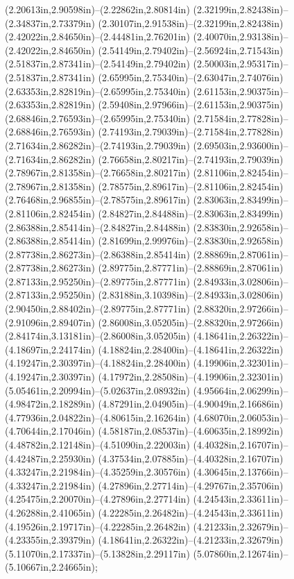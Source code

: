 (2.20613in,2.90598in)--(2.22862in,2.80814in) (2.32199in,2.82438in)--(2.34837in,2.73379in) (2.30107in,2.91538in)--(2.32199in,2.82438in) (2.42022in,2.84650in)--(2.44481in,2.76201in) (2.40070in,2.93138in)--(2.42022in,2.84650in) (2.54149in,2.79402in)--(2.56924in,2.71543in) (2.51837in,2.87341in)--(2.54149in,2.79402in) (2.50003in,2.95317in)--(2.51837in,2.87341in) (2.65995in,2.75340in)--(2.63047in,2.74076in) (2.63353in,2.82819in)--(2.65995in,2.75340in) (2.61153in,2.90375in)--(2.63353in,2.82819in) (2.59408in,2.97966in)--(2.61153in,2.90375in) (2.68846in,2.76593in)--(2.65995in,2.75340in) (2.71584in,2.77828in)--(2.68846in,2.76593in) (2.74193in,2.79039in)--(2.71584in,2.77828in) (2.71634in,2.86282in)--(2.74193in,2.79039in) (2.69503in,2.93600in)--(2.71634in,2.86282in) (2.76658in,2.80217in)--(2.74193in,2.79039in) (2.78967in,2.81358in)--(2.76658in,2.80217in) (2.81106in,2.82454in)--(2.78967in,2.81358in) (2.78575in,2.89617in)--(2.81106in,2.82454in) (2.76468in,2.96855in)--(2.78575in,2.89617in) (2.83063in,2.83499in)--(2.81106in,2.82454in) (2.84827in,2.84488in)--(2.83063in,2.83499in) (2.86388in,2.85414in)--(2.84827in,2.84488in) (2.83830in,2.92658in)--(2.86388in,2.85414in) (2.81699in,2.99976in)--(2.83830in,2.92658in) (2.87738in,2.86273in)--(2.86388in,2.85414in) (2.88869in,2.87061in)--(2.87738in,2.86273in) (2.89775in,2.87771in)--(2.88869in,2.87061in) (2.87133in,2.95250in)--(2.89775in,2.87771in) (2.84933in,3.02806in)--(2.87133in,2.95250in) (2.83188in,3.10398in)--(2.84933in,3.02806in) (2.90450in,2.88402in)--(2.89775in,2.87771in) (2.88320in,2.97266in)--(2.91096in,2.89407in) (2.86008in,3.05205in)--(2.88320in,2.97266in) (2.84174in,3.13181in)--(2.86008in,3.05205in) (4.18641in,2.26322in)--(4.18697in,2.24174in) (4.18824in,2.28400in)--(4.18641in,2.26322in) (4.19247in,2.30397in)--(4.18824in,2.28400in) (4.19906in,2.32301in)--(4.19247in,2.30397in) (4.17972in,2.28508in)--(4.19906in,2.32301in) (5.05461in,2.20994in)--(5.02637in,2.08932in) (4.95664in,2.06299in)--(4.98472in,2.18289in) (4.87291in,2.04905in)--(4.90049in,2.16686in) (4.77936in,2.04822in)--(4.80615in,2.16264in) (4.68070in,2.06053in)--(4.70644in,2.17046in) (4.58187in,2.08537in)--(4.60635in,2.18992in) (4.48782in,2.12148in)--(4.51090in,2.22003in) (4.40328in,2.16707in)--(4.42487in,2.25930in) (4.37534in,2.07885in)--(4.40328in,2.16707in) (4.33247in,2.21984in)--(4.35259in,2.30576in) (4.30645in,2.13766in)--(4.33247in,2.21984in) (4.27896in,2.27714in)--(4.29767in,2.35706in) (4.25475in,2.20070in)--(4.27896in,2.27714in) (4.24543in,2.33611in)--(4.26288in,2.41065in) (4.22285in,2.26482in)--(4.24543in,2.33611in) (4.19526in,2.19717in)--(4.22285in,2.26482in) (4.21233in,2.32679in)--(4.23355in,2.39379in) (4.18641in,2.26322in)--(4.21233in,2.32679in) (5.11070in,2.17337in)--(5.13828in,2.29117in) (5.07860in,2.12674in)--(5.10667in,2.24665in);
